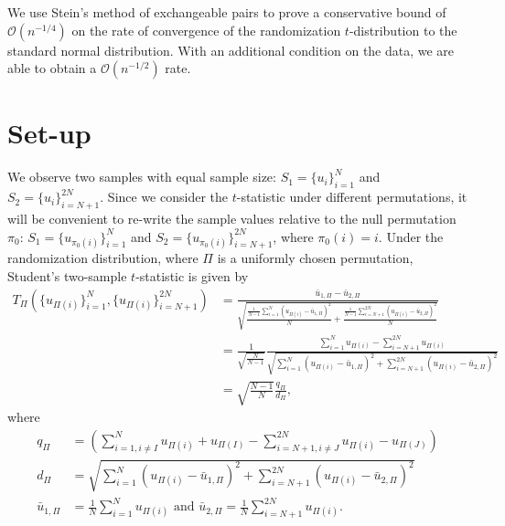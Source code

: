 We use Stein's method of exchangeable pairs to prove a conservative
bound of $\mathcal{O}(n^{-1/4})$ on the rate of convergence of the randomization
$t$-distribution to the standard normal distribution.  With an
additional condition on the data, we are able to obtain a
$\mathcal{O}(n^{-1/2})$ rate.

\section{Set-up}
We observe two samples with equal sample size: $S_1 = \{u_i\}_{i=1}^N$
and $S_2 = \{u_i\}_{i=N+1}^{2N}$.  Since we consider the $t$-statistic
under different permutations, it will be convenient to re-write the
sample values relative to the null permutation $\pi_0$: $S_1 =
\{u_{\pi_0(i)}\}_{i=1}^N$ and $S_2 = \{u_{\pi_0(i)}\}_{i=N+1}^{2N}$,
where $\pi_0(i) = i$.  Under the randomization distribution, where
$\Pi$ is a uniformly chosen permutation, Student's two-sample
$t$-statistic is given by
\begin{align*}
T_{\Pi}(\{u_{\Pi(i)}\}_{i=1}^N, \{u_{\Pi(i)}\}_{i=N+1}^{2N})
&= \frac{\bar{u}_{1,\Pi} - \bar{u}_{2,\Pi}}{\sqrt{\frac{\frac{1}{N-1}
      \sum_{i=1}^N(u_{\Pi(i)} - \bar{u}_{1,\Pi})^2}{N} + \frac{\frac{1}{N-1}
      \sum_{i=N+1}^{2N}(u_{\Pi(i)} - \bar{u}_{2,\Pi})^2}{N}}} \\
&= \frac{1}{\sqrt{\frac{N}{N-1}}} \frac{\sum_{i=1}^N u_{\Pi(i)} -
  \sum_{i=N+1}^{2N}u_{\Pi(i)}}{\sqrt{\sum_{i=1}^N(u_{\Pi(i)} -
    \bar{u}_{1,\Pi})^2 + \sum_{i=N+1}^{2N}(u_{\Pi(i)} - \bar{u}_{2,\Pi})^2}} \\
&= \sqrt{\frac{N-1}{N}}\frac{q_\Pi}{d_\Pi},
\end{align*}
where
\begin{align*}
  q_\Pi &= \left (\sum_{i=1, i\neq I}^N u_{\Pi(i)} + u_{\Pi(I)} -
    \sum_{i=N+1, i\neq J}^{2N}u_{\Pi(i)} - u_{\Pi(J)}\right ) \\
  d_\Pi &= \sqrt{\sum_{i=1}^N(u_{\Pi(i)} - \bar{u}_{1,\Pi})^2 +
    \sum_{i=N+1}^{2N}(u_{\Pi(i)} - \bar{u}_{2,\Pi})^2} \\
  \bar{u}_{1,\Pi} &= \frac{1}{N} \sum_{i=1}^N u_{\Pi(i)} \text{ and }
  \bar{u}_{2,\Pi} = \frac{1}{N} \sum_{i=N+1}^{2N} u_{\Pi(i)}.
\end{align*}

